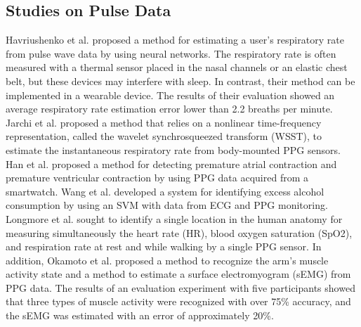 \documentclass[manuscript,screen,review]{acmart}
\begin{document}
\subsection{Studies on Pulse Data}
Havriushenko et al. \cite{respiratory_rate_estimation1} proposed a method for estimating a user's respiratory rate from pulse wave data by using neural networks. The respiratory rate is often measured with a thermal sensor placed in the nasal channels or an elastic chest belt, but these devices may interfere with sleep. In contrast, their method can be implemented in a wearable device. The results of their evaluation showed an average respiratory rate estimation error lower than 2.2 breaths per minute. Jarchi et al. \cite{respiratory_rate_estimation2} proposed a method that relies on a nonlinear time-frequency representation, called the wavelet synchrosqueezed transform (WSST), to estimate the instantaneous respiratory rate from body-mounted PPG sensors. Han et al. \cite{arrhythmia_detection} proposed a method for detecting premature atrial contraction and premature ventricular contraction by using PPG data acquired from a smartwatch. Wang et al. \cite{alcohol_detection} developed a system for identifying excess alcohol consumption by using an SVM with data from ECG and PPG monitoring. Longmore et al. \cite{ppg_location} sought to identify a single location in the human anatomy for measuring simultaneously the heart rate (HR), blood oxygen saturation (SpO2), and respiration rate at rest and while walking by a single PPG sensor. In addition, Okamoto et al. \cite{semg_okamoto} proposed a method to recognize the arm's muscle activity state and a method to estimate a surface electromyogram (sEMG) from PPG data. The results of an evaluation experiment with five participants showed that three types of muscle activity were recognized with over 75\% accuracy, and the sEMG was estimated with an error of approximately 20\%.\par
\end{document}
